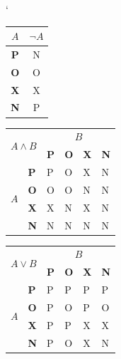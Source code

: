 \documentclass[a4paper, 11 pt]{article}
\begin{document}
\begin{table}[h]

		\centering
		\catcode`
\begin{tabular}{|c|c|}
		\hline
		$A$          & ${\neg}A$	\\ \hline
		\textbf{P} 	& 	N			\\ \hline
		\textbf{O} 	& 	O			\\ \hline
		\textbf{X} 	& 	X 			\\ \hline
		\textbf{N} 	& 	P 			\\ \hline
\end{tabular}
\begin{tabular}{|l|l|l|l|l|l|}
\hline
\multicolumn{2}{|l|}{\multirow{2}{*}{$ A \wedge B $}} & \multicolumn{4}{c|}{$B$}                \\ \cline{3-6} 
\multicolumn{2}{|l|}{}                      & \textbf{P} & \textbf{O} & \textbf{X} & \textbf{N} \\ \hline
\multirow{4}{*}{$A$}     & \textbf{P}       & P          & O          & X          & N          \\ \cline{2-6} 
                         & \textbf{O}       & O          & O          & N          & N          \\ \cline{2-6} 
                         & \textbf{X}       & X          & N          & X          & N          \\ \cline{2-6} 
                         & \textbf{N}       & N          & N          & N          & N          \\ \hline
\end{tabular}
\begin{tabular}{|l|l|l|l|l|l|}
\hline
\multicolumn{2}{|l|}{\multirow{2}{*}{$ A \vee B $}} & \multicolumn{4}{c|}{$B$}                  \\ \cline{3-6} 
\multicolumn{2}{|l|}{}                      & \textbf{P} & \textbf{O} & \textbf{X} & \textbf{N} \\ \hline
\multirow{4}{*}{$A$}     & \textbf{P}       & P          & P          & P          & P          \\ \cline{2-6} 
                         & \textbf{O}       & P          & O          & P          & O          \\ \cline{2-6} 
                         & \textbf{X}       & P          & P          & X          & X          \\ \cline{2-6} 
                         & \textbf{N}       & P          & O          & X          & N          \\ \hline

\end{tabular}
\end{table}
\end{document}

